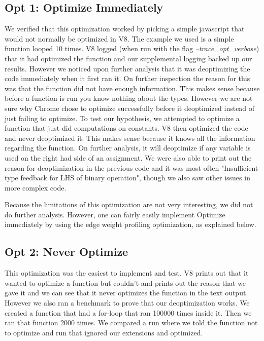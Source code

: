 \documentclass[twocolumn,showpacs,%
  nofootinbib,aps,superscriptaddress,%
  eqsecnum,prd,notitlepage,showkeys,10pt]{revtex4-1}
\begin{document}
\subsection{Opt 1: Optimize Immediately}
We verified that this optimization worked by picking a simple javascript that would not normally be optimized in V8. The example we used is a simple function looped 10 times. V8 logged (when run with the flag \textit{--trace\_opt\_verbose}) that it had optimized the function and our supplemental logging backed up our results.  However we noticed upon further analysis that it was deoptimizing the code immediately when it first ran it. On further inspection the reason for this was that the function did not have enough information. This makes sense because before a function is run you know nothing about the types. However we are not sure why Chrome chose to optimize successfully before it deoptimized instead of just failing to optimize. To test our hypothesis, we attempted to optimize a function that just did computations on constants. V8 then optimized the code and never deoptimized it. This makes sense because it knows all the information regarding the function. On further analysis, it will deoptimize if any variable is used on the right had side of an assignment. We were also able to print out the reason for deoptimization in the previous code and it was most often "Insufficient type feedback for LHS of binary operation", though we also saw other issues in more complex code.

Because the limitations of this optimization are not very interesting, we did not do further analysis. However, one can fairly easily implement Optimize immediately by using the edge weight profiling optimization, as explained below.

\subsection{Opt 2: Never Optimize}
This optimization was the easiest to implement and test. V8 prints out that it wanted to optimize a function but couldn't and prints out the reason that we gave it and we can see that it never optimizes the function in the text output. However we also ran a benchmark to prove that our deoptimization works. We created a function that had a for-loop that ran 100000 times inside it. Then we ran that function 2000 times. We compared a run where we told the function not to optimize and run that ignored our extensions and optimized.\\ 
\end{document}
